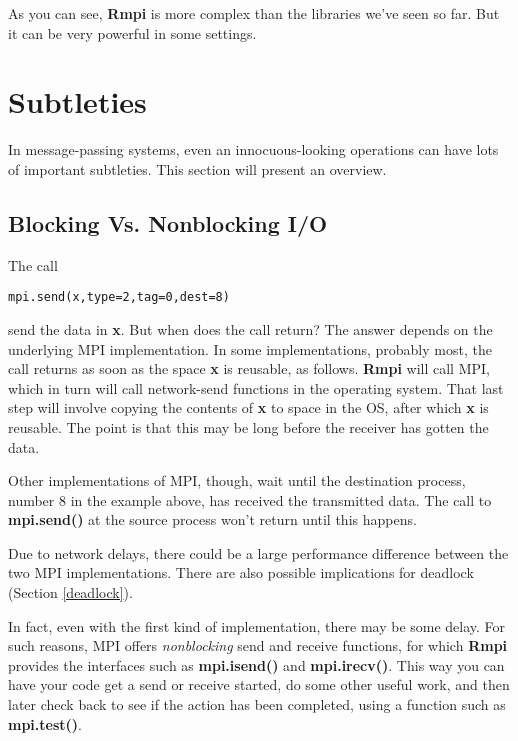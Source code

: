 As you can see, {\bf Rmpi} is more complex than the libraries we've seen
so far.  But it can be very powerful in some settings.

\section{Subtleties}

In message-passing systems, even an innocuous-looking operations
can have lots of important subtleties.  This section will present an
overview.

\subsection{Blocking Vs. Nonblocking I/O}
\label{nonblock}

The call

\begin{lstlisting}
mpi.send(x,type=2,tag=0,dest=8)
\end{lstlisting}

send the data in {\bf x}.  But when does the call return?  The answer
depends on the underlying MPI implementation.  In some implementations,
probably most, the call returns as soon as the space {\bf x} is
reusable, as follows.  {\bf Rmpi} will call MPI, which in turn will call
network-send functions in the operating system.  That last step will
involve copying the contents of {\bf x} to space in the OS, after which
{\bf x} is reusable.  The point is that this may be long before the
receiver has gotten the data.

Other implementations of MPI, though, wait until the destination
process, number 8 in the example above, has received the transmitted
data.  The call to {\bf mpi.send()} at the source process won't return
until this happens.

Due to network delays, there could be a large performance difference
between the two MPI implementations.  There are also possible
implications for deadlock (Section \ref{deadlock}).

In fact, even with the first kind of implementation, there may be some
delay.  For such reasons, MPI offers {\it nonblocking} send and receive
functions, for which {\bf Rmpi} provides the interfaces such as {\bf
mpi.isend()} and {\bf mpi.irecv()}.  This way you can have your code get
a send or receive started, do some other useful work, and then later
check back to see if the action has been completed, using a function
such as {\bf mpi.test()}.

